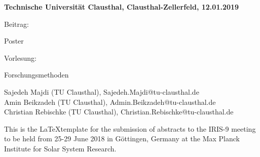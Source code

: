 \documentclass[11pt]{article}
\newcommand{\type}[1]{Beitrag:\par#1}
\newcommand{\session}[1]{\vspace{5mm}Vorlesung:\par#1\par}
\renewcommand{\title}[1]{\vspace{5mm}{\Large\bf#1}\par}
\newcommand{\authors}[1]{\vspace{5mm}#1\par}
\renewcommand{\abstract}[1]{\vspace{5mm}\parbox{\textwidth}{#1}}
\begin{document}
\centerline{\bf Technische Universität Clausthal, Clausthal-Zellerfeld, 12.01.2019}{\vspace{5mm}


\type{%
	Poster               \par
}%


\session{%
%
	Forschungsmethoden            \par
%
}%


\title{%
Prototyping
}%


\authors{%
Sajedeh Majdi (TU Clausthal), Sajedeh.Majdi@tu-clausthal.de \\
Amin Beikzadeh (TU Clausthal), Admin.Beikzadeh@tu-clausthal.de \\
Christian Rebischke (TU Clausthal), Christian.Rebischke@tu-clausthal.de
}%


\abstract{%
%
This is the \LaTeX template for the submission of abstracts to the IRIS-9 meeting to be held from 25-29 June 2018 in G\"ottingen, Germany at the Max Planck Institute for Solar System Research.

}}
\end{document}
